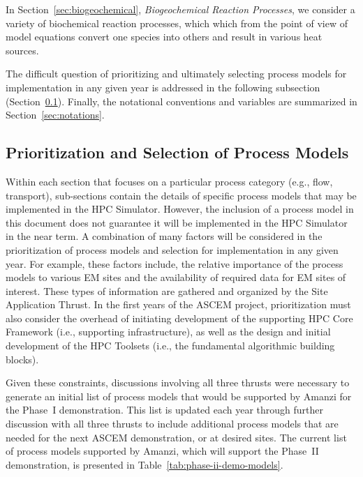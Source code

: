 In Section~\ref{sec:biogeochemical}, \emph{Biogeochemical Reaction Processes},
we consider a variety of biochemical reaction processes,
which which from the point of view of model equations
convert one species into others and result in various heat sources.
  

The difficult question of prioritizing and ultimately selecting process
models for implementation in any given year is addressed in the
following subsection (Section~\ref{sec:selecting-process-models}).
Finally, the notational conventions and variables are summarized in
Section~\ref{sec:notations}.


\subsection{Prioritization and Selection of Process Models}
\label{sec:selecting-process-models}

Within each section that focuses on a particular process category
(e.g., flow, transport), sub-sections contain the details of specific
process models that may be implemented in the HPC Simulator.
However, the inclusion of a process model in this document does not
guarantee it will be implemented in the HPC Simulator in the near
term.  A combination of many factors will be considered in the
prioritization of process models and selection for implementation in
any given year.  For example, these factors include, the relative
importance of the process models to various EM sites and the
availability of required data for EM sites of interest.  These types
of information are gathered and organized by the Site Application
Thrust.  In the first years of the ASCEM project, prioritization must also
consider the overhead of initiating development of the supporting HPC
Core Framework (i.e., supporting infrastructure), as well as the design and 
initial development of the HPC Toolsets (i.e., the fundamental algorithmic
building blocks).

Given these constraints, discussions involving all three thrusts were
necessary to generate an initial list of process models that would be
supported by Amanzi for the Phase~I demonstration. This list is
updated each year through further discussion with all three thrusts to
include additional process models that are needed for the next ASCEM
demonstration, or at desired sites.  The current list of process
models supported by Amanzi, which will support the Phase~II
demonstration, is presented in Table~\ref{tab:phase-ii-demo-models}.

